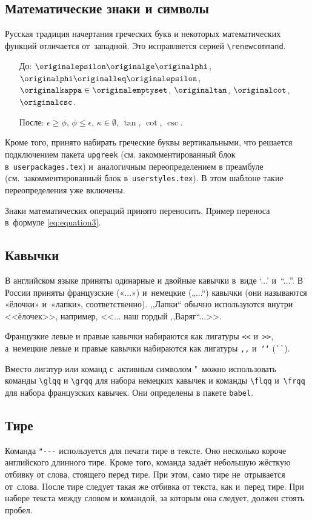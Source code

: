 \subsection{Математические знаки и символы}

Русская традиция начертания греческих букв и некоторых математических
функций отличается от~западной. Это исправляется серией
\verb|\renewcommand|.
\begin{itemize}
	\item[До:] \( \originalepsilon \originalge \originalphi\),
	\(\originalphi \originalleq \originalepsilon\),
	\(\originalkappa \in \originalemptyset\),
	\(\originaltan\),
	\(\originalcot\),
	\(\originalcsc\).
	\item[После:] \( \epsilon \ge \phi\),
	\(\phi \leq \epsilon\),
	\(\kappa \in \emptyset\),
	\(\tan\),
	\(\cot\),
	\(\csc\).
\end{itemize}

Кроме того, принято набирать греческие буквы вертикальными, что
решается подключением пакета \verb|upgreek| (см. закомментированный
блок в~\verb|userpackages.tex|) и~аналогичным переопределением в
преамбуле (см.~закомментированный блок в~\verb|userstyles.tex|). В
этом шаблоне такие переопределения уже включены.

Знаки математических операций принято переносить. Пример переноса
в~формуле \eqref{eq:equation3}.

\subsection{Кавычки}
В английском языке приняты одинарные и двойные кавычки в~виде ‘...’ и~“...”.
В России приняты французские («...») и~немецкие („...“) кавычки (они называются
«ёлочки» и~«лапки», соответственно). ,,Лапки`` обычно используются внутри
<<ёлочек>>, например, <<... наш гордый ,,Варяг``...>>.

Французкие левые и правые кавычки набираются
как лигатуры \verb|<<| и~\verb|>>|, а~немецкие левые
и правые кавычки набираются как лигатуры \verb|,,| и~\verb|‘‘| (\verb|``|).

Вместо лигатур или команд с~активным символом "\ можно использовать команды
\verb|\glqq| и \verb|\grqq| для набора немецких кавычек и команды \verb|\flqq|
и~\verb|\frqq| для набора французских кавычек. Они определены в пакете
\verb|babel|.

\subsection{Тире}
Команда \verb|"---| используется для печати тире в тексте. Оно несколько короче
английского длинного тире. Кроме того, команда задаёт небольшую жёсткую отбивку
от слова, стоящего перед тире. При этом, само тире не~отрывается от~слова.
После тире следует такая же отбивка от текста, как и~перед тире. При наборе
текста между словом и командой, за которым она следует, должен стоять пробел.

